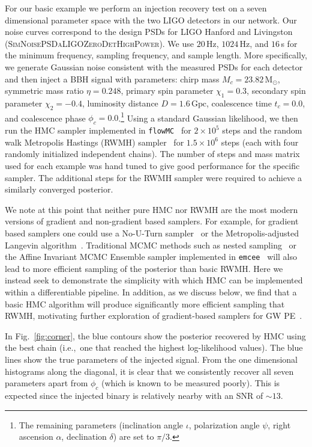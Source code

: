 \documentclass[twocolumn]{aastex631}
\newcommand{\flowMC}{\texttt{flowMC}\xspace}
\begin{document}
For our basic example we perform an injection recovery test on a seven dimensional parameter space with the two LIGO detectors in our network.
Our noise curves correspond to the design PSDs for LIGO Hanford and Livingston (\textsc{SimNoisePSDaLIGOZeroDetHighPower}).
We use $20\,$Hz, $1024\,$Hz, and $16\,$s for the minimum frequency, sampling frequency, and sample length.
More specifically, we generate Gaussian noise consistent with the measured PSDs for each detector and then inject a BBH signal with parameters: chirp mass $M_c = 23.82\,\mathrm{M_\odot}$,  symmetric mass ratio $\eta = 0.248$, primary spin parameter $\chi_1=0.3$, secondary spin parameter $\chi_2=-0.4$, luminosity distance $D = 1.6\,\mathrm{Gpc}$, coalescence time $t_c = 0.0$, and coalescence phase $\phi_c = 0.0$.\footnote{
    The remaining parameters (inclination angle $\iota$, polarization angle $\psi$, right ascension $\alpha$, declination $\delta$) are set to $\pi/3$.
}
Using a standard Gaussian likelihood, we then run the HMC sampler implemented in \flowMC~\citep{2022arXiv221106397W} for $2\times10^5$ steps and the random walk Metropolis Hastings (RWMH) sampler~\citep{1953JChPh..21.1087M} for $1.5\times10^6$ steps (each with four randomly initialized independent chains). 
The number of steps and mass matrix used for each example was hand tuned to give good performance for the specific sampler.
The additional steps for the RWMH sampler were required to achieve a similarly converged posterior.

We note at this point that neither pure HMC nor RWMH are the most modern versions of gradient and non-gradient based samplers.
For example, for gradient based samplers one could use a No-U-Turn sampler~\citep{2011arXiv1111.4246H} or the Metropolis-adjusted Langevin algorithm~\citep{2013arXiv1309.2983X}.
Traditional MCMC methods such as nested sampling~\citep{Skilling2004, multinest, dynesty} or the Affine Invariant MCMC Ensemble sampler implemented in \texttt{emcee}~\citep{2013PASP..125..306F} will also lead to more efficient sampling of the posterior than basic RWMH.
Here we instead seek to demonstrate the simplicity with which HMC can be implemented within a differentiable pipeline.
In addition, as we discuss below, we find that a basic HMC algorithm will produce significantly more efficient sampling that RWMH, motivating further exploration of gradient-based samplers for GW PE~\citep{PEpaper}.


In Fig.~\ref{fig:corner}, the blue contours show the posterior recovered by HMC using the best chain (i.e.,~one that reached the highest log-likelihood values).
The blue lines show the true parameters of the injected signal.
From the one dimensional histograms along the diagonal, it is clear that we consistently recover all seven parameters apart from $\phi_c$ (which is known to be measured poorly).
This is expected since the injected binary is relatively nearby with an SNR of $\sim13$.
\end{document}
